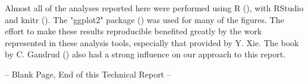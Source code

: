 \documentclass[12pt,twoside,english]{article}\usepackage[]{graphicx}\usepackage[]{color}
\begin{document}
Almost all of the analyses reported here were performed using R (\citet{Rlanguage}), with RStudio  \citet{RStudio2012} and knitr (\citet{Xie2014a,Xie2014b}). The
"ggplot2" package (\citet{wickham2009}) was used for many of the figures. The effort to make these results reproducible benefited greatly by the work represented in these analysis tools, especially that provided by Y. Xie. The book by C. Gandrud (\citet{Gandrud2014}) also had a strong influence on our approach to this report.


\label{sec:bibliography}
\clearpage
{}
{}

\clearpage
{}
{}
\printindex[lis]{}
\clearpage
{}
{}
\printindex[var]{}
\clearpage
{}
{}
\printindex[idx]{}

\clearpage

\centerline{-- Blank Page, End of this Technical Report --}
\vfill\eject
\clearpage
{}
\end{document}
